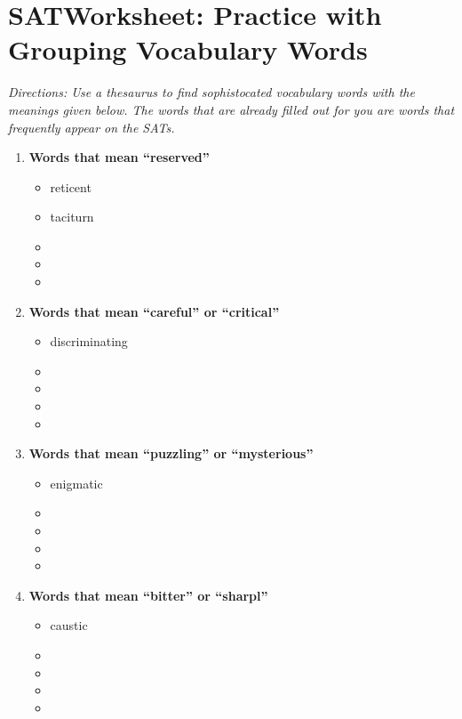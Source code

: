 \section{SATWorksheet: Practice with Grouping Vocabulary Words}

\textit{Directions: Use a thesaurus to find sophistocated vocabulary words with the meanings given below. The words that are already filled out for you are words that frequently appear on the SATs.}

\begin{enumerate}

\item \textbf{Words that mean ``reserved''}

\begin{itemize}
\item  reticent
\item  taciturn
\item   
\item   
\item  

\end{itemize}


\item \textbf{Words that mean ``careful'' or ``critical''}

\begin{itemize}
\item discriminating   
\item    
\item   
\item   
\item  

\end{itemize}

\item \textbf{Words that mean ``puzzling'' or ``mysterious''}

\begin{itemize}
\item enigmatic
\item    
\item   
\item   
\item  

\end{itemize}

\item \textbf{Words that mean ``bitter'' or ``sharpl''}

\begin{itemize}
\item caustic     
\item    
\item   
\item   
\item  


\end{itemize}
\end{enumerate}

